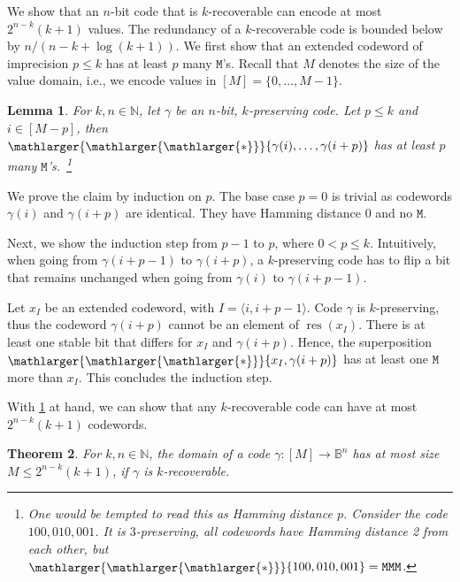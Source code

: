 \documentclass[9pt,journal,compsoc]{IEEEtran}
\newtheorem{theorem}{Theorem}[section]
\newtheorem{lemma}[theorem]{Lemma}
\theoremstyle{remark}
\DeclareMathOperator{\res}{res}
\newcommand{\bigstarr}{\mathop{\raisebox{-.7pt}{\ensuremath{\mathlarger{\mathlarger{\mathlarger{*}}}}}}}
\newcommand{\mfu}{\mathtt{M}}
\newcommand{\IN}{\mathbb{N}}
\newcommand{\IB}{\mathbb{B}}
\newcommand{\ang}[1]{\langle{#1}\rangle}
\newcommand{\intvl}[1]{\ang{#1}}
\begin{document}
We show that an $n$-bit code that is $k$-recoverable can encode at most $2^{n-k}(k+1)$ values.
The redundancy of a $k$-recoverable code is bounded below by $n/(n-k+\log(k+1))$.
We first show that an extended codeword of imprecision $p\leq k$  has at least $p$ many $\mfu$'s. Recall that $M$ denotes the size of the value domain, i.e., we encode values in $[M] = \{0,\dots,M-1\}$. %

\begin{lemma}\label{lem:bitdist}
  For $k,n\in\IN$, let $\gamma$ be an $n$-bit, $k$-preserving code.
  Let $p\leq k$ and $i\in[M-p]$, then $\bigstarr
    \{\gamma(i),\ldots,\gamma(i+p)\}$ has at least $p$ many 
    $\mfu$'s.~\footnote{One would be tempted to read this as Hamming 
    distance $p$. Consider the code $100,010,001$. It is $3$-preserving, 
    all codewords have Hamming distance 2 from each other, but $\bigstarr\{100, 010,001\}=\mfu \mfu \mfu$.}
\end{lemma}

\begin{IEEEproof}
   We prove the claim by induction on $p$. The base case $p=0$ is
     trivial as codewords $\gamma(i)$ and $\gamma(i+p)$ are identical.
     They have Hamming distance $0$ and no $\mfu$.

   Next, we show the induction step from $p-1$ to $p$, where $0<p\leq k$.
   Intuitively, when going from $\gamma(i+p-1)$ to $\gamma(i+p)$, a 
     $k$-preserving code has to flip a bit that remains unchanged when 
     going from $\gamma(i)$ to $\gamma(i+p-1)$.

   Let $x_I$ be an extended codeword, with $I=\intvl{i,i+p-1}$. 
   Code $\gamma$ is $k$-preserving, thus the codeword $\gamma(i+p)$ 
     cannot be an element of $\res(x_I)$.
   There is at least one stable bit that differs for $x_I$ and $\gamma(i+p)$.
   Hence, the superposition $\bigstarr\{x_I,\gamma(i+p)\}$ has at least one 
     $\mfu$ more than $x_I$.
   This concludes the induction step.
\end{IEEEproof}

With \cref{lem:bitdist} at hand, we can show that any $k$-recoverable code can have
  at most $2^{n-k}(k+1)$ codewords.

\begin{theorem}\label{lem:recoverability}
  For $k,n\in\IN$, the domain of a code
  $\gamma\colon[M]\rightarrow\IB^n$ has at most size $M \leq 2^{n-k}(k+1)$, if $\gamma$
  is $k$-recoverable.
\end{theorem}
\end{document}
